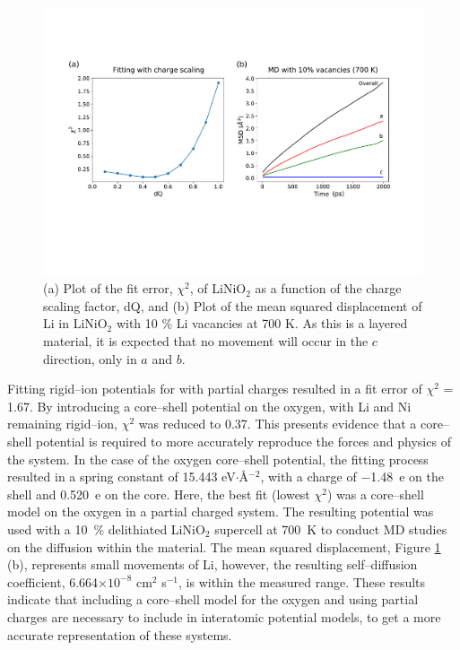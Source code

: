 \documentclass[journal=jacsat,manuscript=article]{achemso}
\begin{document}
\begin{figure}[h]
    \centering
    \includegraphics[scale=0.46]{Figures/LiNiO2_plots.pdf}
    \caption{\label{fig:LiNiO2_fitting} (a) Plot of the fit error, $\chi^2$, of LiNiO$_2$ as a function of the charge scaling factor, dQ, and (b) Plot of the mean squared displacement of Li in LiNiO$_2$ with 10 \% Li vacancies at 700 K. As this is a layered material, it is expected that no movement will occur in the $c$ direction, only in $a$ and $b$.}
\end{figure}

Fitting rigid--ion potentials for  with partial charges resulted in a fit error of $\chi^2$ = 1.67.
By introducing a core--shell potential on the oxygen, with Li and Ni remaining rigid--ion, $\chi^2$ was reduced to 0.37. 
This presents evidence that a core--shell potential is required to more accurately reproduce the forces and physics of the system.
In the case of the oxygen core--shell potential, the fitting process resulted in a spring constant of 15.443 eV$\cdot$\AA$^{-2}$, with a charge of \SI{-1.48}{e} on the shell and \SI{0.520}{e} on the core.
Here, the best fit (lowest $\chi^2$) was a core--shell model on the oxygen in a partial charged system. The resulting potential was used with a 10~\% delithiated LiNiO$_2$ supercell at \SI{700}{K} to conduct MD studies on the diffusion within the material.
The mean squared displacement, Figure \ref{fig:LiNiO2_fitting} (b), represents small movements of Li, however, the resulting self--diffusion coefficient, 6.664$\times 10^{-8}$ cm$^{2}$ s$^{-1}$, is within the measured range.\cite{Nakamura2000,bruce1992vacancy}
These results indicate that including a core--shell model for the oxygen and using partial charges are necessary to include in interatomic potential models, to get a more accurate representation of these systems.
\end{document}
